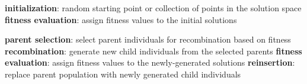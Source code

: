 


\begin{algorithmic}[1]
        \State \textbf{initialization}: random starting point or collection of points in the solution space
        \State \textbf{fitness evaluation}: assign fitness values to the initial solutions

            \State \textbf{parent selection}: select parent individuals for recombination based on fitness
            \State \textbf{recombination}: generate new child individuals from the selected parents
            \State \textbf{fitness evaluation}: assign fitness values to the newly-generated solutions
            \State \textbf{reinsertion}: replace parent population with newly generated child individuals
        \EndWhile
        \State {}
    \EndProcedure
\end{algorithmic}
